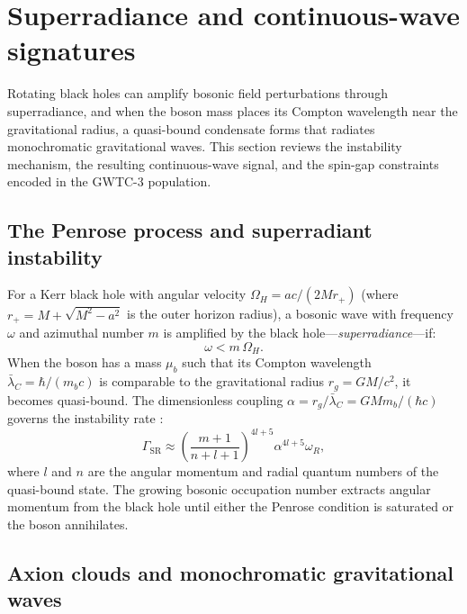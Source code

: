 \documentclass[11pt,a4paper, english]{book}
\theoremstyle{plain}
\theoremstyle{definition}
\numberwithin{equation}{chapter}
\numberwithin{figure}{chapter}
\numberwithin{table}{chapter}
\begin{document}
\section{Superradiance and continuous-wave signatures}
\label{app:sec:superradiance}
Rotating black holes can amplify bosonic field perturbations through superradiance, and when the boson mass places its Compton wavelength near the gravitational radius, a quasi-bound condensate forms that radiates monochromatic gravitational waves. This section reviews the instability mechanism, the resulting continuous-wave signal, and the spin-gap constraints encoded in the GWTC-3 population.
\subsection{The Penrose process and superradiant instability}
\label{app:subsec:penrose}

For a Kerr black hole with angular velocity $\Omega_H = ac/(2Mr_+)$ (where $r_+ = M + \sqrt{M^2-a^2}$ is the outer horizon radius), a bosonic wave with frequency $\omega$ and azimuthal number $m$ is amplified by the black hole---\emph{superradiance}---if:
\begin{equation}
  \label{eq:penrose_condition}
  \omega < m\,\Omega_H.
\end{equation}
When the boson has a mass $\mu_b$ such that its Compton wavelength $\bar{\lambda}_C = \hbar/(m_b c)$ is comparable to the gravitational radius $r_g = GM/c^2$, it becomes quasi-bound. The dimensionless coupling $\alpha = r_g / \bar{\lambda}_C = G M m_b / (\hbar c)$ governs the instability rate \cite{Arvanitaki_2011}:
\begin{equation}
  \label{eq:superradiance_rate}
  \Gamma_\mathrm{SR} \approx
    \left(\frac{m+1}{n+l+1}\right)^{4l+5}\alpha^{4l+5}\omega_R,
\end{equation}
where $l$ and $n$ are the angular momentum and radial quantum numbers of the quasi-bound state. The growing bosonic occupation number extracts angular momentum from the black hole until either the Penrose condition is saturated or the boson annihilates.

\subsection{Axion clouds and monochromatic gravitational waves}
\label{app:subsec:axion-clouds}
\end{document}

